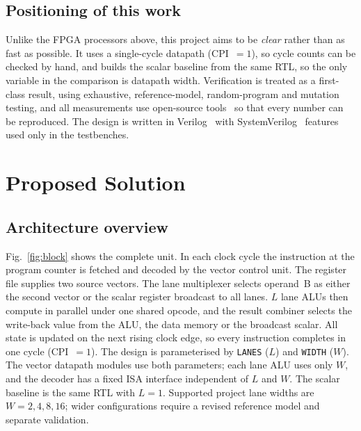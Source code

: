 \documentclass[conference]{IEEEtran}
\begin{document}
\subsection{Positioning of this work}
Unlike the FPGA processors above, this project aims to be \emph{clear} rather
than as fast as possible. It uses a single-cycle datapath (CPI~$=1$), so cycle
counts can be checked by hand, and builds the scalar baseline from the same RTL,
so the only variable in the comparison is datapath width. Verification is treated
as a first-class result, using exhaustive, reference-model, random-program
and mutation testing, and all measurements use open-source
tools~\cite{shah2019} so that every number can be reproduced.
The design is written in Verilog~\cite{ieee1364} with SystemVerilog~\cite{ieee1800}
features used only in the testbenches.

\section{Proposed Solution}
\label{sec:solution}
\subsection{Architecture overview}
Fig.~\ref{fig:block} shows the complete unit. In each clock cycle the
instruction at the program counter is fetched and decoded by the vector control
unit. The register file supplies two source vectors. The lane multiplexer
selects operand~B as either the second vector or the scalar register broadcast
to all lanes. $L$ lane ALUs then compute in parallel under one shared opcode,
and the result combiner selects the write-back value from the ALU, the data
memory or the broadcast scalar. All state is updated on the next rising clock
edge, so every instruction completes in one cycle (CPI~$=1$). The design is
parameterised by \texttt{LANES} ($L$) and \texttt{WIDTH} ($W$). The vector
datapath modules use both parameters; each lane ALU uses only $W$, and the
decoder has a fixed ISA interface independent of $L$ and $W$. The scalar
baseline is the same RTL with $L=1$.
Supported project lane widths are $W=2,4,8,16$; wider configurations require
a revised reference model and separate validation.
\end{document}
